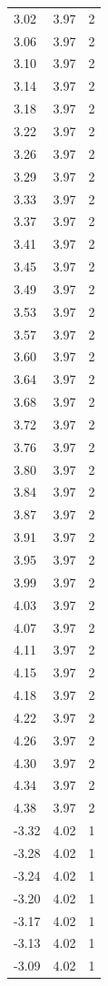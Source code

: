 \begin{longtable}{lrr}
  3.02 & 3.97 & 2 \\
  3.06 & 3.97 & 2 \\
  3.10 & 3.97 & 2 \\
  3.14 & 3.97 & 2 \\
  3.18 & 3.97 & 2 \\
  3.22 & 3.97 & 2 \\
  3.26 & 3.97 & 2 \\
  3.29 & 3.97 & 2 \\
  3.33 & 3.97 & 2 \\
  3.37 & 3.97 & 2 \\
  3.41 & 3.97 & 2 \\
  3.45 & 3.97 & 2 \\
  3.49 & 3.97 & 2 \\
  3.53 & 3.97 & 2 \\
  3.57 & 3.97 & 2 \\
  3.60 & 3.97 & 2 \\
  3.64 & 3.97 & 2 \\
  3.68 & 3.97 & 2 \\
  3.72 & 3.97 & 2 \\
  3.76 & 3.97 & 2 \\
  3.80 & 3.97 & 2 \\
  3.84 & 3.97 & 2 \\
  3.87 & 3.97 & 2 \\
  3.91 & 3.97 & 2 \\
  3.95 & 3.97 & 2 \\
  3.99 & 3.97 & 2 \\
  4.03 & 3.97 & 2 \\
  4.07 & 3.97 & 2 \\
  4.11 & 3.97 & 2 \\
  4.15 & 3.97 & 2 \\
  4.18 & 3.97 & 2 \\
  4.22 & 3.97 & 2 \\
  4.26 & 3.97 & 2 \\
  4.30 & 3.97 & 2 \\
  4.34 & 3.97 & 2 \\
  4.38 & 3.97 & 2 \\
  -3.32 & 4.02 & 1 \\
  -3.28 & 4.02 & 1 \\
  -3.24 & 4.02 & 1 \\
  -3.20 & 4.02 & 1 \\
  -3.17 & 4.02 & 1 \\
  -3.13 & 4.02 & 1 \\
  -3.09 & 4.02 & 1 \\

\end{longtable}
